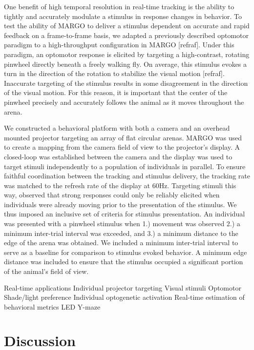 \documentclass[10pt]{article}
\begin{document}
\begin{multicols}{2}
One benefit of high temporal resolution in real-time tracking is the ability to tightly and accurately modulate a stimulus in response changes in behavior. To test the ability of MARGO to deliver a stimulus dependent on accurate and rapid feedback on a frame-to-frame basis, we adapted a previously described optomotor paradigm to a high-throughput configuration in MARGO [refraf]. Under this paradigm, an optomotor response is elicited by targeting a high-contrast, rotating pinwheel directly beneath a freely walking fly. On average, this stimulus evokes a turn in the direction of the rotation to stabilize the visual motion [refraf]. Inaccurate targeting of the stimulus results in some disagreement in the direction of the visual motion. For this reason, it is important that the center of the pinwheel precisely and accurately follows the animal as it moves throughout the arena.

We constructed a behavioral platform with both a camera and an overhead mounted projector targeting an array of flat circular arenas. MARGO was used to create a mapping from the camera field of view to the projector's display. A closed-loop was established between the camera and the display was used to target stimuli independently to a population of individuals in parallel. To ensure faithful coordination between the tracking and stimulus delivery, the tracking rate was matched to the refresh rate of the display at 60Hz. Targeting stimuli this way, observed that strong responses could only be reliably elicited when individuals were already moving prior to the presentation of the stimulus. We thus imposed an inclusive set of criteria for stimulus presentation. An individual was presented with a pinwheel stimulus when 1.) movement was observed 2.) a minimum inter-trial interval was exceeded, and 3.) a minimum distance to the edge of the arena was obtained. We included a minimum inter-trial interval to serve as a baseline for comparison to stimulus evoked behavior. A minimum edge distance was included to ensure that the stimulus occupied a significant portion of the animal's field of view.

Real-time applications
Individual projector targeting
Visual stimuli
Optomotor
Shade/light preference
Individual optogenetic activation
Real-time estimation of behavioral metrics
LED Y-maze

\section{Discussion}


\end{multicols}
\end{document}
